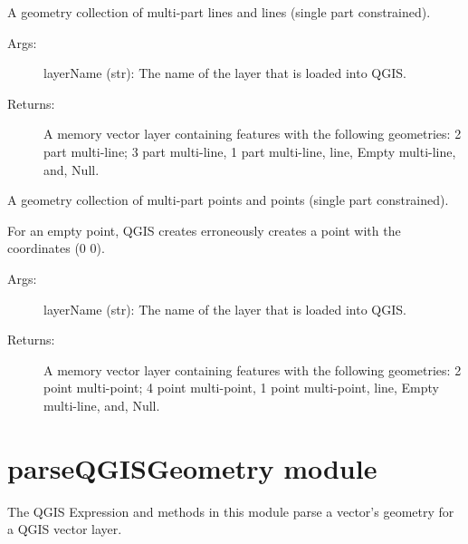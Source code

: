 \documentclass[letterpaper,10pt,english]{sphinxmanual}
\begin{document}
\begin{fulllineitems}
\label{\detokenize{API:modelVectorLayers.createMultiLines}}
A geometry collection of multi-part lines and lines (single part constrained).
\begin{description}
\item[{Args:}] \leavevmode
layerName (str): The name of the layer that is loaded into QGIS.

\item[{Returns:}] \leavevmode
A memory vector layer containing features with the following geometries: 2 part multi-line; 3 part multi-line,
1 part multi-line, line, Empty multi-line, and, Null.

\end{description}

\end{fulllineitems}


\begin{fulllineitems}
\label{\detokenize{API:modelVectorLayers.createMultiPoints}}
A geometry collection of multi-part points and points (single part constrained).

For an empty point, QGIS creates erroneously creates a point with the coordinates (0 0).
\begin{description}
\item[{Args:}] \leavevmode
layerName (str): The name of the layer that is loaded into QGIS.

\item[{Returns:}] \leavevmode
A memory vector layer containing features with the following geometries: 2 point multi-point; 4 point multi-point,
1 point multi-point, line, Empty multi-line, and, Null.

\end{description}

\end{fulllineitems}



\section{parseQGISGeometry module}
\label{\detokenize{API:module-parseQGISGeometry}}\label{\detokenize{API:parseqgisgeometry-module}}\label{\detokenize{API:parseqgisgeometry-api}}
The QGIS Expression and methods in this module parse a vector’s geometry for a QGIS vector layer.
\end{document}
